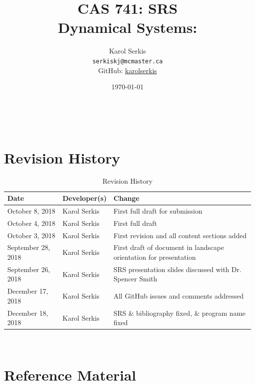 \documentclass[12pt]{article}
\begin{document}

\title{CAS 741: SRS\\[10pt]\Large Dynamical Systems: \progname}
\author{Karol Serkis\\\texttt{serkiskj@mcmaster.ca}\\GitHub:
\href{https://www.github.com/karolserkis}{karolserkis}}
\date{\today}
	
\maketitle

~\newpage

\tableofcontents

\clearpage

\setcounter{secnumdepth}{0}

\section{Revision History}

\begin{table}[hp]
\caption{Revision History}
\begin{tabularx}{\textwidth}{llX}
\toprule
\textbf{Date} & \textbf{Developer(s)} & \textbf{Change}\\
\midrule
October 8, 2018 & Karol Serkis &  First full draft for submission\\
October 4, 2018 & Karol Serkis &  First full draft\\
October 3, 2018 & Karol Serkis & First revision and all content sections added
\\September 28, 2018 & 
Karol Serkis & First draft of document in landscape
orientation for presentation\\
September 26, 2018 & Karol Serkis & SRS presentation slides discussed with Dr.
Spencer Smith \\
December 17, 2018 & Karol Serkis & All GitHub issues and comments addressed \\
December 18, 2018 & Karol Serkis & SRS \& bibliography fixed, 
\& program name fixed \\
\bottomrule
\end{tabularx}
\end{table}

~\newpage

\section{Reference Material}
\end{document}
